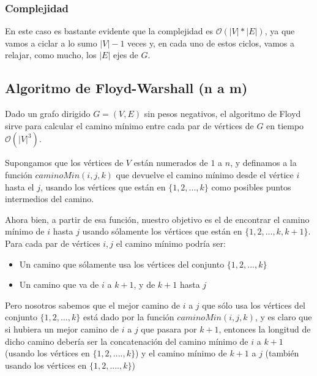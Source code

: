 \subsubsection*{Complejidad}

En este caso es bastante evidente que la complejidad es $\mathcal{O}(|V| * |E|)$, ya que vamos a ciclar a lo sumo $|V|-1$ veces y, en cada uno de estos ciclos, vamos a relajar, como mucho, los $|E|$ ejes de $G$.

\newpage
\subsection{Algoritmo de Floyd-Warshall (n a m)}

Dado un grafo dirigido $G = (V, E)$ sin pesos negativos, el algoritmo de Floyd sirve para calcular el camino m\'inimo entre cada par de v\'ertices de $G$ en tiempo $\mathcal{O}(|V|^3)$.


Supongamos que los v\'ertices de $V$ est\'an numerados de $1$ a $n$, y definamos a la funci\'on $caminoMin(i,j,k)$ que devuelve el camino m\'inimo desde el v\'ertice $i$ hasta el $j$, usando los v\'ertices que est\'an en $\{1, 2, ..., k\}$ como posibles puntos intermedios del camino.

Ahora bien, a partir de esa funci\'on, nuestro objetivo es el de encontrar el camino m\'inimo de $i$ hasta $j$ usando s\'olamente los v\'ertices que est\'an en $\{1, 2, ..., k, k+1\}$. Para cada par de v\'ertices $i,j$ el camino m\'inimo podr\'ia ser:

\begin{itemize}
\item Un camino que s\'olamente usa los v\'ertices del conjunto $\{1, 2, ..., k\}$
\item Un camino que va de $i$ a $k+1$, y de $k+1$ hasta $j$
\end{itemize}

Pero nosotros sabemos que el mejor camino de $i$ a $j$ que s\'olo usa los v\'ertices del conjunto $\{1, 2, ..., k\}$ est\'a dado por la funci\'on $caminoMin(i,j,k)$, y es claro que si hubiera un mejor camino de $i$ a $j$ que pasara por $k+1$, entonces la longitud de dicho camino deber\'ia ser la concatenaci\'on del camino m\'inimo de $i$ a $k+1$ (usando los v\'ertices en $\{1, 2, ...., k\}$) y el camino m\'inimo de $k+1$ a $j$ (tambi\'en usando los v\'ertices en $\{1, 2, ...., k\}$)

